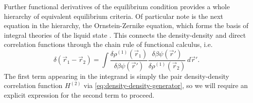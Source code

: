 Further functional derivatives of the equilibrium condition provides a whole hierarchy of equivalent equilibrium criteria.
Of particular note is the next equation in the hierarchy, the Ornstein-Zernike equation, which forms the basis of integral theories of the liquid state%
.
This connects the density-density and direct correlation functions through the chain rule of functional calculus, i.e.\
\begin{equation}\label{eq:oz-chain-rule}
  \delta(\vec{r}_1 - \vec{r}_2) =
  \int
  \frac{\delta \rho^{(1)}(\vec{r}_1)}{\delta \beta\psi(\vec{r}')}
  \frac{\delta \beta\psi(\vec{r}')}{\delta \rho^{(1)}(\vec{r}_2)}
  \, d\vec{r}'.
\end{equation}
The first term appearing in the integrand is simply the pair density-density correlation function $H^{(2)}$ via \eqref{eq:density-density-generator},
so we will require an explicit expression for the second term to proceed.


